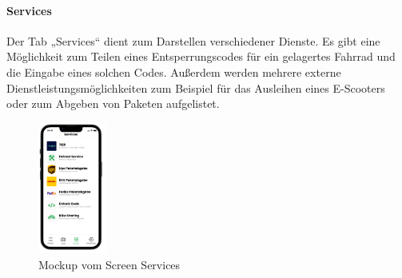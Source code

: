 \paragraph{Services}Der Tab „Services“ dient zum Darstellen verschiedener Dienste. Es gibt eine Möglichkeit zum Teilen eines Entsperrungscodes für ein gelagertes Fahrrad und die Eingabe eines solchen Codes. Außerdem werden mehrere externe Dienstleistungsmöglichkeiten zum Beispiel für das Ausleihen eines E-Scooters oder zum Abgeben von Paketen aufgelistet.\\
\begin{figure}[H]
  \centering
  \includegraphics[width=0.2\textwidth]{images/app_mock_services}
  \caption{Mockup vom Screen Services}
  \label{fig:screenservicesmock}
\end{figure}

